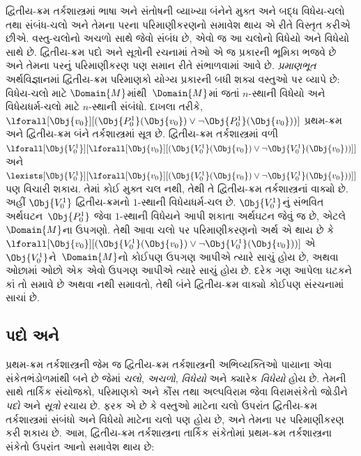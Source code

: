 દ્વિતીય-ક્રમ તર્કશાસ્ત્રમાં ભાષા અને સંતોષની વ્યાખ્યા બંનેને મુક્ત અને
બદ્ધ વિધેય-ચલો તથા સંબંધ-ચલો અને તેમના પરના પરિમાણીકરણનો સમાવેશ થાય
એ રીતે વિસ્તૃત કરીએ છીએ. વસ્તુ-ચલોનો અચળો સાથે જેવો સંબંધ છે,
એવો જ આ ચલોનો વિધેયો અને વિધેયો સાથે છે. દ્વિતીય-ક્રમ
પદો અને સૂત્રોની રચનામાં તેઓ એ જ પ્રકારની ભૂમિકા ભજવે છે અને
તેમના પરનું પરિમાણીકરણ પણ સમાન રીતે સંભાળવામાં આવે છે. \emph{પ્રમાણભૂત}
અર્થવિજ્ઞાનમાં દ્વિતીય-ક્રમ પરિમાણકો યોગ્ય પ્રકારની બધી શક્ય વસ્તુઓ
પર વ્યાપે છે: વિધેય-ચલો માટે $\Domain{M}$માંથી~$\Domain{M}$માં જતાં
$n$-સ્થાની વિધેયો અને વિધેયધર્મ-ચલો માટે $n$-સ્થાની સંબંધો.
દાખલા તરીકે,
$\lforall[\Obj{v_0}][(\Obj{P^1_0}(\Obj{v_0}) \lor \lnot
  \Obj{P^1_0}(\Obj{v_0}))]$ પ્રથમ-ક્રમ અને દ્વિતીય-ક્રમ બંને
તર્કશાસ્ત્રમાં સૂત્ર છે. દ્વિતીય-ક્રમ તર્કશાસ્ત્રમાં વળી
$\lforall[\Obj{V^1_0}][\lforall[\Obj{v_0}][(\Obj{V^1_0}(\Obj{v_0}) \lor
    \lnot \Obj{V^1_0}(\Obj{v_0}))]]$ અને
$\lexists[\Obj{V^1_0}][\lforall[\Obj{v_0}][(\Obj{V^1_0}(\Obj{v_0}) \lor
    \lnot \Obj{V^1_0}(\Obj{v_0}))]]$ પણ વિચારી શકાય. તેમાં કોઈ મુક્ત
ચલ નથી, તેથી તે દ્વિતીય-ક્રમ તર્કશાસ્ત્રનાં વાક્યો છે. અહીં
$\Obj{V^1_0}$ દ્વિતીય-ક્રમનો $1$-સ્થાની વિધેયધર્મ-ચલ છે. $\Obj{V^1_0}$નું
સંભવિત અર્થઘટન~$\Obj{P^1_0}$ જેવા $1$-સ્થાની વિધેયને આપી
શકાતા અર્થઘટન જેવું જ છે, એટલે~$\Domain{M}$ના ઉપગણો. તેથી આવા ચલો
પર પરિમાણીકરણનો અર્થ એ થાય છે કે
$\lforall[\Obj{v_0}][(\Obj{V^1_0}(\Obj{v_0}) \lor \lnot
  \Obj{V^1_0}(\Obj{v_0}))]$ એ~$\Obj{V^1_0}$ને~$\Domain{M}$નો કોઈપણ
ઉપગણ આપીએ ત્યારે સાચું હોય છે, અથવા ઓછામાં ઓછો એક એવો ઉપગણ આપીએ
ત્યારે સાચું હોય છે. દરેક ગણ આપેલા ઘટકને કાં તો સમાવે છે અથવા નથી
સમાવતો, તેથી બંને દ્વિતીય-ક્રમ વાક્યો કોઈપણ સંરચનામાં સાચાં છે.




\subsection{પદો અને }\label{sol:syn:frm:sec}

પ્રથમ-ક્રમ તર્કશાસ્ત્રની જેમ જ દ્વિતીય-ક્રમ તર્કશાસ્ત્રની અભિવ્યક્તિઓ
પાયાના એવા સંકેતભંડોળમાંથી બને છે જેમાં \emph{ચલો},
\emph{અચળો}, \emph{વિધેયો} અને ક્યારેક
\emph{વિધેયો} હોય છે. તેમની સાથે તાર્કિક સંયોજકો, પરિમાણકો
અને કૌંસ તથા અલ્પવિરામ જેવા વિરામસંકેતો જોડીને \emph{પદો} અને
\emph{સૂત્રો} રચાય છે. ફરક એ છે કે વસ્તુઓ માટેના ચલો ઉપરાંત
દ્વિતીય-ક્રમ તર્કશાસ્ત્રમાં સંબંધો અને વિધેયો માટેના ચલો પણ હોય છે,
અને તેમના પર પરિમાણીકરણ કરી શકાય છે. આમ, દ્વિતીય-ક્રમ તર્કશાસ્ત્રના
તાર્કિક સંકેતોમાં પ્રથમ-ક્રમ તર્કશાસ્ત્રના સંકેતો ઉપરાંત આનો સમાવેશ થાય છે:

